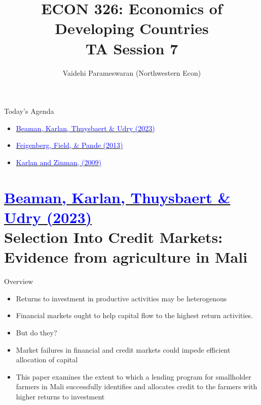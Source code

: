 \documentclass[11pt,notes=hide,aspectratio=169,mathserif]{beamer}
\title[class]{ECON 326: Economics of Developing Countries \\ TA Session 7}
\author[vaidehi's class ]{Vaidehi Parameswaran (Northwestern Econ)}
\date{\monthname[\the\month] \the\year}
\begin{document}
\begin{frame}[plain]
\titlepage
\end{frame}


\begin{frame}{Today's Agenda}

\begin{itemize}
\item \href{https://onlinelibrary-wiley-com.turing.library.northwestern.edu/doi/epdf/10.3982/ECTA18916}{\textcolor{blue}{Beaman, Karlan, Thuysbaert \& Udry (2023)}}
\item \href{https://www.nber.org/system/files/working_papers/w16018/w16018.pdf}{\textcolor{blue}{Feigenberg, Field, \& Pande (2013)}}
\item \href{https://onlinelibrary.wiley.com/doi/abs/10.3982/ECTA5781}{\textcolor{blue}{Karlan and Zinman, (2009)}}
\end{itemize}
\end{frame}

\section*{\href{https://onlinelibrary-wiley-com.turing.library.northwestern.edu/doi/epdf/10.3982/ECTA18916}{\textcolor{blue}{Beaman, Karlan, Thuysbaert \& Udry (2023)}} \\[5mm] 
\textnormal{\small{Selection Into Credit Markets: Evidence from agriculture in  Mali}}}

\begin{frame}{Overview}

\begin{itemize}
\item Returns to investment in productive activities may be heterogenous
\item Financial markets ought to help capital flow to the highest return activities. 
\item But do they?
\item Market failures in financial and credit markets could impede efficient allocation of capital
\item This paper examines the extent to which a lending program for smallholder farmers in Mali successfully identifies and allocates credit to the farmers with higher returns to investment
\end{itemize}
\end{frame}
\end{document}
